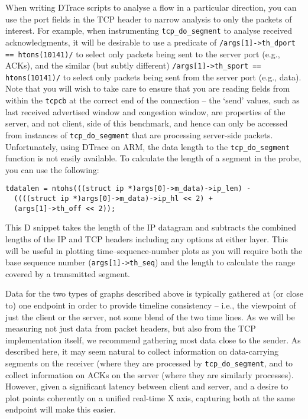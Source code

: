 \documentclass[a4paper,10pt]{article}
\begin{document}
When writing DTrace scripts to analyse a flow in a particular direction, you
can use the port fields in the TCP header to narrow analysis to only the
packets of interest.
For example, when instrumenting \texttt{tcp\_do\_segment} to analyse received
acknowledgments, it will be desirable to use a predicate of
\texttt{/args[1]->th\_dport == htons(10141)/} to select only packets being
sent to the server port (e.g., ACKs), and the similar (but subtly different)
\texttt{/args[1]->th\_sport == htons(10141)/} to select only packets being
sent from the server port (e.g., data).
Note that you will wish to take care to ensure that you are reading fields
from within the \texttt{tcpcb} at the correct end of the connection -- the
`send' values, such as last received advertised window and congestion window,
are properties of the server, and not client, side of this benchmark, and
hence can only be accessed from instances of \texttt{tcp\_do\_segment} that
are processing server-side packets.
Unfortunately, using DTrace on ARM, the data length to the \texttt{tcp\_do\_segment} function is not easily available.
To calculate the length of a segment in the probe, you can use the following:

\begin{verbatim}
tdatalen = ntohs(((struct ip *)args[0]->m_data)->ip_len) -
  ((((struct ip *)args[0]->m_data)->ip_hl << 2) +
  (args[1]->th_off << 2));
\end{verbatim}

This D snippet takes the length of the IP datagram and subtracts the combined
lengths of the IP and TCP headers including any options at either layer.
This will be useful in plotting time--sequence-number plots as you will
require both the base sequence number (\texttt{args[1]->th\_seq}) and the
length to calculate the range covered by a transmitted segment.

Data for the two types of graphs described above is typically gathered at (or
close to) one endpoint in order to provide timeline consistency -- i.e., the
viewpoint of just the client or the server, not some blend of the two
time lines.
As we will be measuring not just data from packet headers, but also from the
TCP implementation itself, we recommend gathering most data close to the
sender.
As described here, it may seem natural to collect information on data-carrying
segments on the receiver (where they are processed by
\texttt{tcp\_do\_segment}, and to collect information on ACKs on the server
(where they are similarly processes).
However, given a significant latency between client and server, and a desire
to plot points coherently on a unified real-time X axis, capturing both at the
same endpoint will make this easier.
\end{document}
